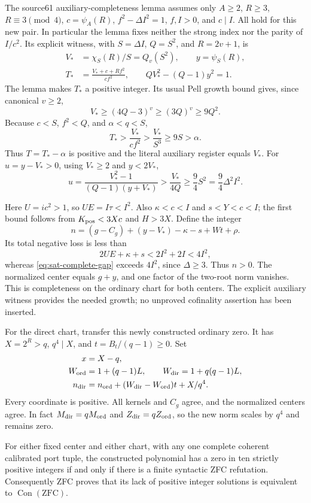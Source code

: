 The source61 auxiliary-completeness lemma assumes only $A\ge2$,
$R\ge3$, $R\equiv3\pmod4$, $c=\psi_A(R)$,
$f^2-\Delta I^2=1$, $f,I>0$, and $c\mid I$.  All hold for this
new pair.  In particular the lemma fixes neither the strong index
nor the parity of $I/c^2$.  Its explicit witness, with
$S=\Delta I$, $Q=S^2$, and $R=2v+1$, is
\begin{align*}
 V_*&=\chi_S(R)/S=Q_v(S^2),\qquad y=\psi_S(R),\\
 T_*&=\frac{V_*+c+Rf^2}{cf^2},\qquad
 QV_*^2-(Q-1)y^2=1.
\end{align*}
The lemma makes $T_*$ a positive integer.  Its usual Pell growth
bound gives, since canonical $v\ge2$,
\[
 V_*\ge(4Q-3)^v\ge(3Q)^v\ge9Q^2.
\]
Because $c<S$, $f^2<Q$, and $\alpha<q<S$,
\[
 T_*>\frac{V_*}{cf^2}>\frac{V_*}{S^3}\ge9S>\alpha.
\]
Thus $T=T_*-\alpha$ is positive and the literal auxiliary register
equals $V_*$.  For $u=y-V_*>0$, using $V_*\ge2$ and $y<2V_*$,
\begin{equation}
 u=\frac{V_*^2-1}{(Q-1)(y+V_*)}
   >\frac{V_*}{4Q}\ge\frac94S^2
   =\frac94\Delta^2I^2.
 \label{eq:sat-complete-gap}
\end{equation}

Here $U=ic^2>1$, so $UE=I\tau<I^2$.  Also
$\kappa<c<I$ and $s<Y<c<I$; the first bound follows from
$K_{\rm pos}<3Xc$ and $H>3X$.  Define the integer
\[
 n=(g-C_g)+(y-V_*)-\kappa-s+Wt+\rho.
\]
Its total negative loss is less than
\[
 2UE+\kappa+s<2I^2+2I<4I^2,
\]
whereas \eqref{eq:sat-complete-gap} exceeds $4I^2$, since
$\Delta\ge3$.  Thus $n>0$.  The normalized center equals
$g+y$, and one factor of the two-root norm vanishes.  This is
completeness on the ordinary chart for both centers.  The explicit
auxiliary witness provides the needed growth; no unproved
cofinality assertion has been inserted.

For the direct chart, transfer this newly constructed ordinary zero.
It has $X=2^R>q$, $q^4\mid X$, and $t=B_t/(q-1)\ge0$.
Set
\begin{align*}
 x&=X-q,\\
 W_{\rm ord}&=1+(q-1)L,\qquad
 W_{\rm dir}=1+q(q-1)L,\\
 n_{\rm dir}&=n_{\rm ord}
       +(W_{\rm dir}-W_{\rm ord})t+X/q^4.
\end{align*}
Every coordinate is positive.  All kernels and $C_g$ agree, and
the normalized centers agree.  In fact
$M_{\rm dir}=qM_{\rm ord}$ and $Z_{\rm dir}=qZ_{\rm ord}$,
so the new norm scales by $q^4$ and remains zero.

\begin{theorem}
\label{thm:saturation-equivalence}
For either fixed center and either chart, with any one complete
coherent calibrated port tuple, the constructed polynomial has a
zero in ten strictly positive integers if and only if there is a
finite syntactic ZFC refutation.  Consequently ZFC proves that its
lack of positive integer solutions is equivalent to
$\operatorname{Con}(\mathrm{ZFC})$.
\end{theorem}

